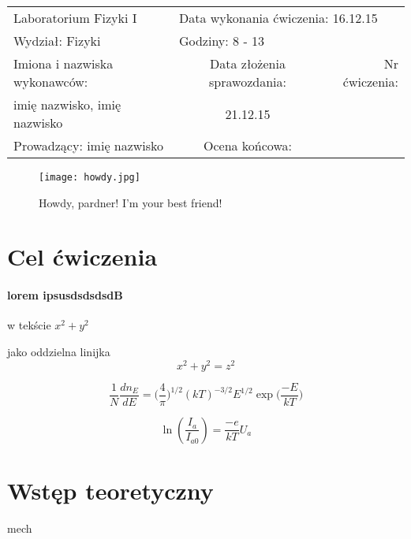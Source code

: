 \documentclass[a4paper,10pt]{article}
\def\arraystretch{1.2}
\begin{document}
\begin{table}
  \centering
  \def\arraystretch{1.5}
    \begin{tabular}{|l|c|r|} \hline
    Laboratorium Fizyki I                  & \multicolumn{2}{l|}{Data wykonania ćwiczenia:    16.12.15  }  \\
    Wydział: Fizyki                        & \multicolumn{2}{l|}{Godziny: 8 - 13}                      \\\hline
    Imiona i nazwiska wykonawców: & Data złożenia sprawozdania: & Nr ćwiczenia:   \\
    imię nazwisko, imię nazwisko                        &  21.12.15                &                          \\\hline
    Prowadzący: imię nazwisko              &Ocena końcowa:                      &                                       \\\hline
  \end{tabular}
\end{table}

\begin{figure}
    \centering
    \texttt{[image: howdy.jpg]}
    \caption{Howdy, pardner! I'm your best friend!}
    \label{flowyyyyyyyy}
\end{figure}

\section{Cel ćwiczenia}
\paragraph{lorem ipsusdsdsdsdB}

w tekście $x^2 + y^2$

jako oddzielna linijka
$$ x^2 + y^2 = z^2 $$

\begin{equation}
 \frac{1}{N}\frac{dn_E}{dE}=\Big(\frac{4}{\pi}\Big)^{1/2}(kT)^{-3/2}E^{1/2}\exp{\Big(\frac{-E}{kT}\Big)}
\end{equation}

\begin{equation}
    \ln{(\frac{I_a}{I_{a0}})} = \frac{-e}{kT}U_a
\end{equation}


\section{Wstęp teoretyczny}
mech
\end{document}
